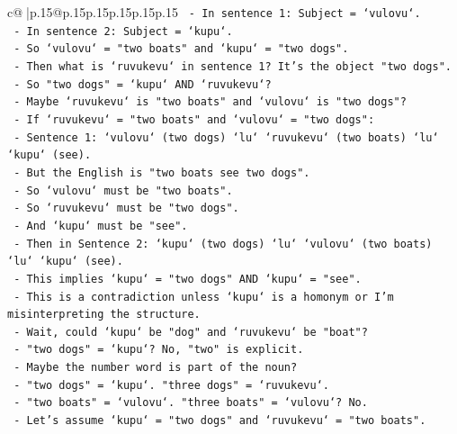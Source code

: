 \documentclass{article}
\begin{document}
{\begin{supertabular}{c@{$\;$}|p{.15\linewidth}@{}p{.15\linewidth}p{.15\linewidth}p{.15\linewidth}p{.15\linewidth}p{.15\linewidth}}
{{{\texttt{                     {-} In sentence 1: Subject = `vulovu`.} \\
\texttt{                     {-} In sentence 2: Subject = `kupu`.} \\
\texttt{                     {-} So `vulovu` = "two boats" and `kupu` = "two dogs".} \\
\texttt{                     {-} Then what is `ruvukevu` in sentence 1? It's the object "two dogs".} \\
\texttt{                     {-} So "two dogs" = `kupu` AND `ruvukevu`?} \\
\texttt{                     {-} Maybe `ruvukevu` is "two boats" and `vulovu` is "two dogs"?} \\
\texttt{                     {-} If `ruvukevu` = "two boats" and `vulovu` = "two dogs":} \\
\texttt{                       {-} Sentence 1: `vulovu` (two dogs) `lu` `ruvukevu` (two boats) `lu` `kupu` (see).} \\
\texttt{                       {-} But the English is "two boats see two dogs".} \\
\texttt{                       {-} So `vulovu` must be "two boats".} \\
\texttt{                       {-} So `ruvukevu` must be "two dogs".} \\
\texttt{                       {-} And `kupu` must be "see".} \\
\texttt{                       {-} Then in Sentence 2: `kupu` (two dogs) `lu` `vulovu` (two boats) `lu` `kupu` (see).} \\
\texttt{                       {-} This implies `kupu` = "two dogs" AND `kupu` = "see".} \\
\texttt{                       {-} This is a contradiction unless `kupu` is a homonym or I'm misinterpreting the structure.} \\
\texttt{                       {-} Wait, could `kupu` be "dog" and `ruvukevu` be "boat"?} \\
\texttt{                       {-} "two dogs" = `kupu`? No, "two" is explicit.} \\
\texttt{                       {-} Maybe the number word is part of the noun?} \\
\texttt{                       {-} "two dogs" = `kupu`. "three dogs" = `ruvukevu`.} \\
\texttt{                       {-} "two boats" = `vulovu`. "three boats" = `vulovu`? No.} \\
\texttt{                       {-} Let's assume `kupu` = "two dogs" and `ruvukevu` = "two boats".} \\
}}}
\end{supertabular}}
\end{document}
